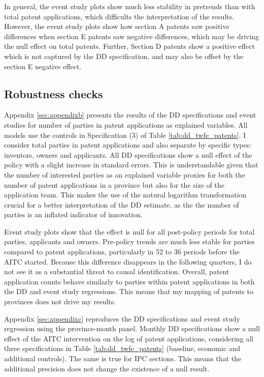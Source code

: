 \documentclass[../main.tex]{subfiles}
\begin{document}
In general, the event study plots show much less stability in pretrends than with total patent applications, which difficults the interpretation of the results. However, the event study plots show how section A patents saw positive differences when section E patents saw negative differences, which may be driving the null effect on total patents. Further, Section D patents show a positive effect which is not captured by the DD specification, and may also be offset by the section E negative effect.

\subsection{Robustness checks}

Appendix \ref{sec:appendixb} presents the results of the DD specifications and event studies for number of parties in patent applications as explained variables. All models use the controls in Specification (3) of Table \ref{tab:dd_twfe_patents}. I consider total parties in patent applications and also separate by specific types: inventors, owners and applicants. All DD specifications show a null effect of the policy with a slight increase in standard errors. This is understandable given that the number of interested parties as an explained variable proxies for both the number of patent applications in a province but also for the size of the application team. This makes the use of the natural logarithm transformation crucial for a better interpretation of the DD estimate, as the the number of parties is an inflated indicator of innovation. 

Event study plots show that the effect is null for all post-policy periods for total parties, applicants and owners. Pre-policy trends are much less stable for parties compared to patent applications, particularly in 52 to 36 periods before the AITC started. Because this difference disappears in the following quarters, I do not see it as a substantial threat to causal identification. Overall, patent application counts behave similarly to parties within patent applications in both the DD and event study regressions. This means that my mapping of patents to provinces does not drive my results.

Appendix \ref{sec:appendixc} reproduces the DD specifications and event study regression using the province-month panel. Monthly DD specifications show a null effect of the AITC intervention on the log of patent applications, considering all three specifications in Table \ref{tab:dd_twfe_patents} (baseline, economic and additional controls). The same is true for IPC sections. This means that the additional precision does not change the existence of a null result. 
\end{document}
